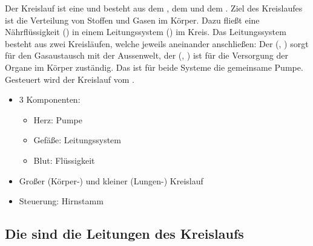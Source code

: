 \TextSlide{\TxBeschreibung}
{%
Der Kreislauf ist eine  
und besteht aus dem , dem  und dem . 
Ziel des Kreislaufes ist die Verteilung von Stoffen und Gasen im  Körper.
Dazu fließt eine Nährflüssigkeit () in einem Leitungssystem 
() im Kreis. Das Leitungssystem  besteht aus zwei 
Kreisläufen, welche jeweils aneinander anschließen: 
% 
Der  
(, 
) 
sorgt für den Gasaustausch mit der Aussenwelt,
der  
(, 
) 
ist für die Versorgung der 
Organe im Körper zuständig.
%
Das  ist für 
beide Systeme die gemeinsame Pumpe.
Gesteuert wird der Kreislauf vom .

}
{
\begin{itemize}
  \item 3 Komponenten:
  \begin{itemize}
    \item Herz: Pumpe
    \item Gefäße: Leitungssystem
    \item Blut: Flüssigkeit
  \end{itemize}
  \item Großer (Körper-) und kleiner (Lungen-) Kreislauf
  \item Steuerung: Hirnstamm
\end{itemize}
}
{}{}{}

\begin{Synopsis}
\end{Synopsis}



\subsection{Die  sind die Leitungen des Kreislaufs}


